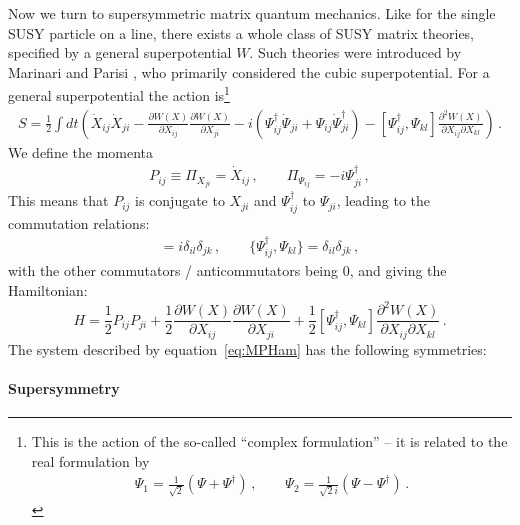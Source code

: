 \documentclass[a4paper,11pt]{article}
\def\be{\begin{equation}}
\def\ee{\end{equation}}
\numberwithin{equation}{section}
\begin{document}
Now we turn to supersymmetric matrix quantum mechanics. Like for the single SUSY particle on a line, there exists a whole class of SUSY matrix theories, specified by a general superpotential $W$. Such theories were introduced by Marinari and Parisi \cite{Marinari:1990jc}, who primarily considered the cubic superpotential. For a general superpotential the action is\footnote{This is the action of the so-called ``complex formulation'' -- it is related to the real formulation by 
\begin{align}
    \Psi_1 = \frac{1}{\sqrt{2}} \left( \Psi + \Psi^\dagger\right) \, ,\qquad
\Psi_2 = \frac{1}{\sqrt{2}i} \left( \Psi - \Psi^\dagger\right) \, .
\end{align}}
%
\begin{align}
    S = \frac{1}{2} \int dt   \left(  \dot{X}_{ij} \dot{X}_{ji}  - \frac{\partial W(X)}{\partial X_{ij}} \frac{\partial W(X)}{\partial X_{ji}} - i \left( \Psi_{ij}^\dagger \dot{\Psi}_{ji} + \Psi_{ij} \dot{\Psi}_{ji}^\dagger \right) -  [\Psi^\dagger_{ij} , \Psi_{kl}] \frac{\partial^2 W(X)}{\partial X_{ij} \partial X_{kl}}\right) \, .
\end{align}
%
We define the momenta
%
\begin{align}
   P_{ij} \equiv \Pi_{X_{ji}}  =  \dot{X}_{ij} \, , \qquad 
\Pi_{\Psi_{ij}} = - i  \Psi^\dagger_{ji} \, , 
\end{align}
%
This means that $P_{ij}$ is conjugate to $X_{ji}$ and $\Psi^\dagger_{ij}$ to $\Psi_{ji}$, leading to the commutation relations:
\begin{align}
    [X_{ij} , P_{kl}] = i \delta_{il} \delta_{jk} \, , \qquad 
\{ \Psi^\dagger_{ij} , \Psi_{kl} \} = \delta_{il} \delta_{jk} \, ,
\end{align}
%
with the other commutators / anticommutators being $0$, and giving the Hamiltonian:
\be
\label{eq:MPHam}
H =  \frac{1}{2} P_{ij} P_{ji} + \frac{1}{2} \frac{\partial W(X)}{\partial X_{ij}} \frac{\partial W(X)}{\partial X_{ji}} + \frac{1}{2}  [\Psi^\dagger_{ij} , \Psi_{kl}] \frac{\partial^2 W(X)}{\partial X_{ij} \partial X_{kl}}  \, .
\ee
%
The system described by equation~\eqref{eq:MPHam} has the following symmetries:

\paragraph{Supersymmetry}
\end{document}
